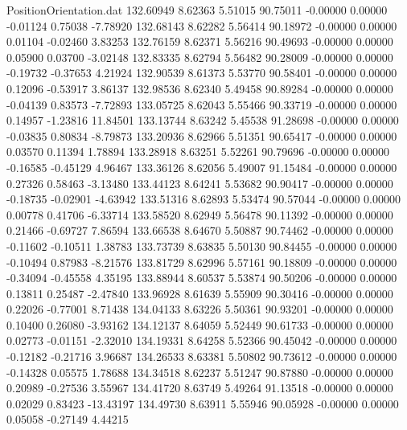\begin{filecontents}{PositionOrientation.dat}
 132.60949    8.62363    5.51015    90.75011   -0.00000    0.00000   -0.01124    0.75038   -7.78920
 132.68143    8.62282    5.56414    90.18972   -0.00000    0.00000    0.01104   -0.02460    3.83253
 132.76159    8.62371    5.56216    90.49693   -0.00000    0.00000    0.05900    0.03700   -3.02148
 132.83335    8.62794    5.56482    90.28009   -0.00000    0.00000   -0.19732   -0.37653    4.21924
 132.90539    8.61373    5.53770    90.58401   -0.00000    0.00000    0.12096   -0.53917    3.86137
 132.98536    8.62340    5.49458    90.89284   -0.00000    0.00000   -0.04139    0.83573   -7.72893
 133.05725    8.62043    5.55466    90.33719   -0.00000    0.00000    0.14957   -1.23816   11.84501
 133.13744    8.63242    5.45538    91.28698   -0.00000    0.00000   -0.03835    0.80834   -8.79873
 133.20936    8.62966    5.51351    90.65417   -0.00000    0.00000    0.03570    0.11394    1.78894
 133.28918    8.63251    5.52261    90.79696   -0.00000    0.00000   -0.16585   -0.45129    4.96467
 133.36126    8.62056    5.49007    91.15484   -0.00000    0.00000    0.27326    0.58463   -3.13480
 133.44123    8.64241    5.53682    90.90417   -0.00000    0.00000   -0.18735   -0.02901   -4.63942
 133.51316    8.62893    5.53474    90.57044   -0.00000    0.00000    0.00778    0.41706   -6.33714
 133.58520    8.62949    5.56478    90.11392   -0.00000    0.00000    0.21466   -0.69727    7.86594
 133.66538    8.64670    5.50887    90.74462   -0.00000    0.00000   -0.11602   -0.10511    1.38783
 133.73739    8.63835    5.50130    90.84455   -0.00000    0.00000   -0.10494    0.87983   -8.21576
 133.81729    8.62996    5.57161    90.18809   -0.00000    0.00000   -0.34094   -0.45558    4.35195
 133.88944    8.60537    5.53874    90.50206   -0.00000    0.00000    0.13811    0.25487   -2.47840
 133.96928    8.61639    5.55909    90.30416   -0.00000    0.00000    0.22026   -0.77001    8.71438
 134.04133    8.63226    5.50361    90.93201   -0.00000    0.00000    0.10400    0.26080   -3.93162
 134.12137    8.64059    5.52449    90.61733   -0.00000    0.00000    0.02773   -0.01151   -2.32010
 134.19331    8.64258    5.52366    90.45042   -0.00000    0.00000   -0.12182   -0.21716    3.96687
 134.26533    8.63381    5.50802    90.73612   -0.00000    0.00000   -0.14328    0.05575    1.78688
 134.34518    8.62237    5.51247    90.87880   -0.00000    0.00000    0.20989   -0.27536    3.55967
 134.41720    8.63749    5.49264    91.13518   -0.00000    0.00000    0.02029    0.83423  -13.43197
 134.49730    8.63911    5.55946    90.05928   -0.00000    0.00000    0.05058   -0.27149    4.44215

\end{filecontents}
